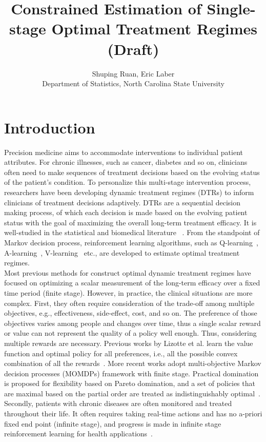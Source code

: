 \documentclass{article}
\title{Constrained Estimation of Single-stage Optimal Treatment Regimes (Draft)}
\author{Shuping Ruan, Eric Laber\\ Department of Statistics, North Carolina State University}
\begin{document}
\maketitle

\section{Introduction}
Precision medicine aims to accommodate interventions to individual patient attributes. For chronic illnesses, such as cancer, diabetes and so on, clinicians often need to make sequences of treatment decisions based on the evolving status of the patient's condition. To personalize this multi-stage intervention process, researchers have been developing dynamic treatment regimes (DTRs) to inform clinicians of treatment decisions adaptively. DTRs are a sequential decision making process, of which each decision is made based on the evolving patient status with the goal of maximizing the overall long-term treatment efficacy. It is well-studied in the statistical and biomedical literature ~\cite{Murphy2003, Moodie2004,Murphy2005,Zhang2012, Laber2014,Linn2014}. From the standpoint of Markov decision process, reinforcement learning algorithms, such as Q-learning~\cite{Murphy2005}, A-learning~\cite{blatt2004learning}, V-learning~\cite{Luckett2016} etc., are developed to estimate optimal treatment regimes. \\

Most previous methods for construct optimal dynamic treatment regimes have focused on optimizing a scalar measurement of the long-term efficacy over a fixed time period (finite stage).  However, in practice, the clinical situations are more complex. First, they often require consideration of the trade-off among multiple objectives, e.g., effectiveness, side-effect, cost, and so on. The preference of those objectives varies among people and changes over time, thus a single scalar reward or value can not represent the quality of a policy well enough. Thus, considering multiple rewards are necessary. Previous works by Lizotte et al. learn the value function and optimal policy for all preferences, i.e., all the possible convex combination of all the rewards~\cite{Lizotte2010,Lizotte2012}. More recent works adopt multi-objective Markov decision processes (MOMDPs) framework with finite stage. Practical domination is proposed for flexibility based on Pareto domination, and a set of policies that are maximal based on the partial order are treated as indistinguishably optimal~\cite{LaberTwo2014, Lizotte2016}. Secondly, patients with chronic diseases are often monitored and treated throughout their life. It often requires taking real-time actions and has no a-priori fixed end point (infinite stage), and progress is made in infinite stage reinforcement learning for health applications~\cite{Ertefaie2014,Murphy2016,Luckett2016}.\\
\end{document}
